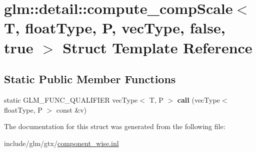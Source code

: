 \hypertarget{structglm_1_1detail_1_1compute__compScale_3_01T_00_01floatType_00_01P_00_01vecType_00_01false_00_01true_01_4}{}\section{glm\+:\+:detail\+:\+:compute\+\_\+comp\+Scale$<$ T, float\+Type, P, vec\+Type, false, true $>$ Struct Template Reference}
\label{structglm_1_1detail_1_1compute__compScale_3_01T_00_01floatType_00_01P_00_01vecType_00_01false_00_01true_01_4}
\subsection*{Static Public Member Functions}
\begin{DoxyCompactItemize}
\item 
\mbox{\label{structglm_1_1detail_1_1compute__compScale_3_01T_00_01floatType_00_01P_00_01vecType_00_01false_00_01true_01_4_a41a36fdb28402c068ed68df6803e7780}} 
static G\+L\+M\+\_\+\+F\+U\+N\+C\+\_\+\+Q\+U\+A\+L\+I\+F\+I\+ER vec\+Type$<$ T, P $>$ {\bfseries call} (vec\+Type$<$ float\+Type, P $>$ const \&v)
\end{DoxyCompactItemize}


The documentation for this struct was generated from the following file\+:\begin{DoxyCompactItemize}
\item 
include/glm/gtx/\hyperlink{component__wise_8inl}{component\+\_\+wise.\+inl}\end{DoxyCompactItemize}
